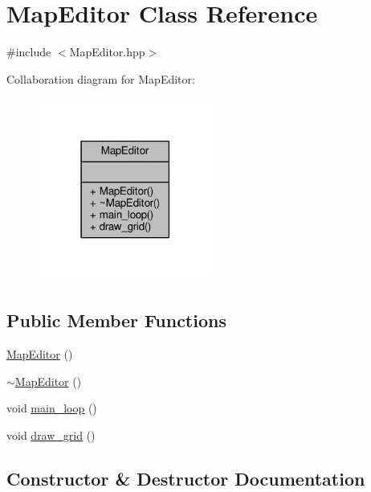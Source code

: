 \hypertarget{class_map_editor}{}\section{Map\+Editor Class Reference}
\label{class_map_editor}


{\ttfamily \#include $<$Map\+Editor.\+hpp$>$}



Collaboration diagram for Map\+Editor\+:\nopagebreak
\begin{figure}[H]
\begin{center}
\leavevmode
\includegraphics[width=162pt]{class_map_editor__coll__graph}
\end{center}
\end{figure}
\subsection*{Public Member Functions}
\begin{DoxyCompactItemize}
\item 
\hyperlink{class_map_editor_a293c325d0b53afcf3924f006cdf60363}{Map\+Editor} ()
\item 
\hyperlink{class_map_editor_a46fe3ce9d636bc72461d00f4c2d6e594}{$\sim$\+Map\+Editor} ()
\item 
void \hyperlink{class_map_editor_a5937c9b49b1e342c219f8a87d8e3dd7a}{main\+\_\+loop} ()
\item 
void \hyperlink{class_map_editor_ac956a51214ea40b1423156efda3e6e11}{draw\+\_\+grid} ()
\end{DoxyCompactItemize}


\subsection{Constructor \& Destructor Documentation}
\hypertarget{class_map_editor_a293c325d0b53afcf3924f006cdf60363}{}
